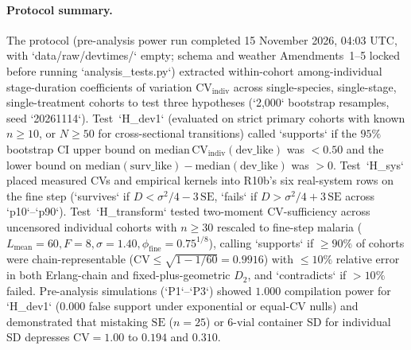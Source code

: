\paragraph{Protocol summary.}
The protocol (pre-analysis power run completed 15 November 2026, 04:03 UTC, with `data/raw/devtimes/` empty; schema and weather Amendments~1--5 locked before running `analysis\_tests.py`) extracted within-cohort among-individual stage-duration coefficients of variation $\mathrm{CV}_{\mathrm{indiv}}$ across single-species, single-stage, single-treatment cohorts to test three hypotheses (`2,000` bootstrap resamples, seed `20261114`). Test~`H\_dev1` (evaluated on strict primary cohorts with known $n \ge 10$, or $N \ge 50$ for cross-sectional transitions) called `supports` if the $95\%$ bootstrap CI upper bound on $\mathrm{median}\,\mathrm{CV}_{\mathrm{indiv}}(\text{dev\_like})$ was $< 0.50$ and the lower bound on $\mathrm{median}(\text{surv\_like}) - \mathrm{median}(\text{dev\_like})$ was $> 0$. Test~`H\_sys` placed measured CVs and empirical kernels into R10b's six real-system rows on the fine step (`survives` if $D < \sigma^2/4 - 3\,\mathrm{SE}$, `fails` if $D > \sigma^2/4 + 3\,\mathrm{SE}$ across `p10`--`p90`). Test~`H\_transform` tested two-moment CV-sufficiency across uncensored individual cohorts with $n \ge 30$ rescaled to fine-step malaria ($L_{\mathrm{mean}} = 60, F = 8, \sigma = 1.40, \phi_{\mathrm{fine}} = 0.75^{1/8}$), calling `supports` if $\ge 90\%$ of cohorts were chain-representable ($\mathrm{CV} \le \sqrt{1 - 1/60} = 0.9916$) with $\le 10\%$ relative error in both Erlang-chain and fixed-plus-geometric $D_2$, and `contradicts` if $> 10\%$ failed. Pre-analysis simulations (`P1`--`P3`) showed $1.000$ compilation power for `H\_dev1` ($0.000$ false support under exponential or equal-CV nulls) and demonstrated that mistaking $\mathrm{SE}$ ($n = 25$) or 6-vial container SD for individual SD depresses $\mathrm{CV} = 1.00$ to $0.194$ and $0.310$.


